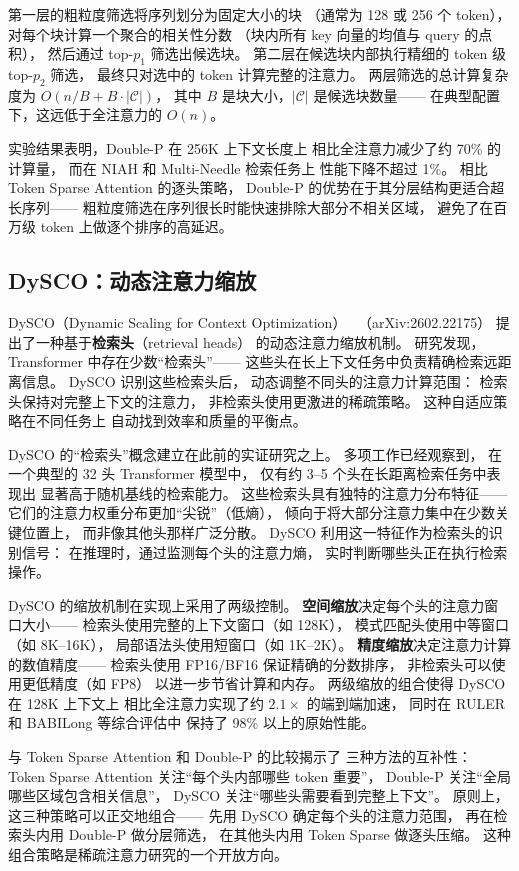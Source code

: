 第一层的粗粒度筛选将序列划分为固定大小的块
（通常为 128 或 256 个 token），
对每个块计算一个聚合的相关性分数
（块内所有 key 向量的均值与 query 的点积），
然后通过 top-$p_1$ 筛选出候选块。
第二层在候选块内部执行精细的 token 级 top-$p_2$ 筛选，
最终只对选中的 token 计算完整的注意力。
两层筛选的总计算复杂度为
$O(n/B + B \cdot |\mathcal{C}|)$，
其中 $B$ 是块大小，$|\mathcal{C}|$ 是候选块数量——
在典型配置下，这远低于全注意力的 $O(n)$。

实验结果表明，Double-P 在 256K 上下文长度上
相比全注意力减少了约 70\% 的计算量，
而在 NIAH 和 Multi-Needle 检索任务上
性能下降不超过 1\%。
相比 Token Sparse Attention 的逐头策略，
Double-P 的优势在于其分层结构更适合超长序列——
粗粒度筛选在序列很长时能快速排除大部分不相关区域，
避免了在百万级 token 上做逐个排序的高延迟。

\subsection{DySCO：动态注意力缩放}

DySCO（Dynamic Scaling for Context Optimization）
~\cite{dysco2026}（arXiv:2602.22175）
提出了一种基于\textbf{检索头}（retrieval heads）
的动态注意力缩放机制。
研究发现，Transformer 中存在少数“检索头”——
这些头在长上下文任务中负责精确检索远距离信息。
DySCO 识别这些检索头后，
动态调整不同头的注意力计算范围：
检索头保持对完整上下文的注意力，
非检索头使用更激进的稀疏策略。
这种自适应策略在不同任务上
自动找到效率和质量的平衡点。

DySCO 的“检索头”概念建立在此前的实证研究之上。
多项工作已经观察到，
在一个典型的 32 头 Transformer 模型中，
仅有约 3--5 个头在长距离检索任务中表现出
显著高于随机基线的检索能力。
这些检索头具有独特的注意力分布特征——
它们的注意力权重分布更加“尖锐”（低熵），
倾向于将大部分注意力集中在少数关键位置上，
而非像其他头那样广泛分散。
DySCO 利用这一特征作为检索头的识别信号：
在推理时，通过监测每个头的注意力熵，
实时判断哪些头正在执行检索操作。

DySCO 的缩放机制在实现上采用了两级控制。
\textbf{空间缩放}决定每个头的注意力窗口大小——
检索头使用完整的上下文窗口（如 128K），
模式匹配头使用中等窗口（如 8K--16K），
局部语法头使用短窗口（如 1K--2K）。
\textbf{精度缩放}决定注意力计算的数值精度——
检索头使用 FP16/BF16 保证精确的分数排序，
非检索头可以使用更低精度（如 FP8）
以进一步节省计算和内存。
两级缩放的组合使得 DySCO 在 128K 上下文上
相比全注意力实现了约 $2.1\times$ 的端到端加速，
同时在 RULER 和 BABILong 等综合评估中
保持了 98\% 以上的原始性能。

与 Token Sparse Attention 和 Double-P 的比较揭示了
三种方法的互补性：
Token Sparse Attention 关注“每个头内部哪些 token 重要”，
Double-P 关注“全局哪些区域包含相关信息”，
DySCO 关注“哪些头需要看到完整上下文”。
原则上，这三种策略可以正交地组合——
先用 DySCO 确定每个头的注意力范围，
再在检索头内用 Double-P 做分层筛选，
在其他头内用 Token Sparse 做逐头压缩。
这种组合策略是稀疏注意力研究的一个开放方向。

